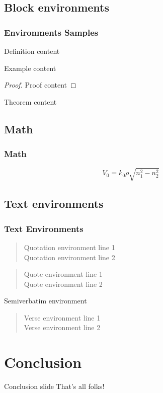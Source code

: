 \documentclass[aspectratio=169]{beamer}
\begin{document}
\subsection{Block environments}

\begin{frame}[label=environments]\frametitle{Environments Samples}
    
	\begin{definition}
	Definition content
	\end{definition}
  
	\begin{example}
	Example content
	\end{example}

	\begin{proof}
	Proof content
	\end{proof}  
    
	\begin{theorem}
	Theorem content
	\end{theorem}

\end{frame}


\subsection{Math}

\begin{frame}[label=math]\frametitle{Math}
    
\begin{equation}
	V_0 = k_0 \rho \sqrt{n_1^2 - n_2^2}
\end{equation}

\end{frame}


\subsection{Text environments}

\begin{frame}[label=text]\frametitle{Text Environments}
    
\begin{quotation}
  Quotation environment line 1\\
  Quotation environment line 2
\end{quotation}
\begin{quote}
  Quote environment line 1\\
  Quote environment line 2
\end{quote}
\begin{semiverbatim}
  Semiverbatim environment
\end{semiverbatim}
\begin{verse}
  Verse environment line 1\\
  Verse environment line 2
\end{verse}  

\end{frame}

\section{Conclusion}

\begin{frame}[label=conclu]{Conclusion slide}
	That's all folks!
\end{frame}

\end{document}

